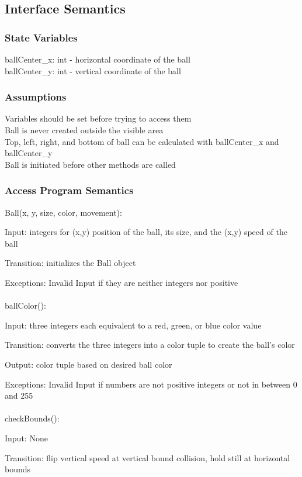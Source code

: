 \documentclass[12pt, titlepage]{article}
\begin{document}
		\subsection{Interface Semantics}
		\subsubsection{State Variables}
		ballCenter\_x: int - horizontal coordinate of the ball \\
		ballCenter\_y: int - vertical coordinate of the ball
		
		\subsubsection{Assumptions}
		Variables should be set before trying to access them \\ 
		Ball is never created outside the visible area \\
		Top, left, right, and bottom of ball can be calculated with ballCenter\_x and ballCenter\_y \\
		Ball is initiated before other methods are called
		
		\subsubsection{Access Program Semantics}
		Ball(x, y, size, color, movement):
		
		Input: integers for (x,y) position of the ball, its size, and the (x,y) speed of the ball
		
		Transition: initializes the Ball object
		
		Exceptions: Invalid Input if they are neither integers nor positive\\
		\\
		ballColor():
		
		Input: three integers each equivalent to a red, green, or blue color value
		
		Transition: converts the three integers into a color tuple to create the ball's color
		
		Output: color tuple based on desired ball color
		
		Exceptions: Invalid Input if numbers are not positive integers or not in between 0 and 255\\	
		\\
		checkBounds():
		
		Input: None
		
		Transition: flip vertical speed at vertical bound collision, hold still at horizontal bounds 
		
\end{document}
